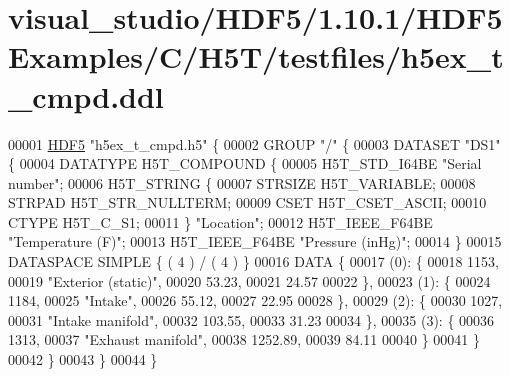 \hypertarget{visual__studio_2_h_d_f5_21_810_81_2_h_d_f5_examples_2_c_2_h5_t_2testfiles_2h5ex__t__cmpd_8ddl_source}{}\section{visual\+\_\+studio/\+H\+D\+F5/1.10.1/\+H\+D\+F5\+Examples/\+C/\+H5\+T/testfiles/h5ex\+\_\+t\+\_\+cmpd.ddl}
\label{visual__studio_2_h_d_f5_21_810_81_2_h_d_f5_examples_2_c_2_h5_t_2testfiles_2h5ex__t__cmpd_8ddl_source}

\begin{DoxyCode}
00001 \hyperlink{namespace_h_d_f5}{HDF5} \textcolor{stringliteral}{"h5ex\_t\_cmpd.h5"} \{
00002 GROUP \textcolor{stringliteral}{"/"} \{
00003    DATASET \textcolor{stringliteral}{"DS1"} \{
00004       DATATYPE  H5T\_COMPOUND \{
00005          H5T\_STD\_I64BE \textcolor{stringliteral}{"Serial number"};
00006          H5T\_STRING \{
00007             STRSIZE H5T\_VARIABLE;
00008             STRPAD H5T\_STR\_NULLTERM;
00009             CSET H5T\_CSET\_ASCII;
00010             CTYPE H5T\_C\_S1;
00011          \} \textcolor{stringliteral}{"Location"};
00012          H5T\_IEEE\_F64BE \textcolor{stringliteral}{"Temperature (F)"};
00013          H5T\_IEEE\_F64BE \textcolor{stringliteral}{"Pressure (inHg)"};
00014       \}
00015       DATASPACE  SIMPLE \{ ( 4 ) / ( 4 ) \}
00016       DATA \{
00017       (0): \{
00018             1153,
00019             \textcolor{stringliteral}{"Exterior (static)"},
00020             53.23,
00021             24.57
00022          \},
00023       (1): \{
00024             1184,
00025             \textcolor{stringliteral}{"Intake"},
00026             55.12,
00027             22.95
00028          \},
00029       (2): \{
00030             1027,
00031             \textcolor{stringliteral}{"Intake manifold"},
00032             103.55,
00033             31.23
00034          \},
00035       (3): \{
00036             1313,
00037             \textcolor{stringliteral}{"Exhaust manifold"},
00038             1252.89,
00039             84.11
00040          \}
00041       \}
00042    \}
00043 \}
00044 \}
\end{DoxyCode}
